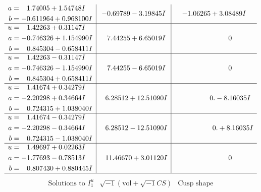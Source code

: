 \documentclass[1p]{elsarticle_modified}
\theoremstyle{definition}
\newcommand{\I}{\sqrt{-1}}
\begin{document}
$$\begin{array}{c|c|c}
\begin{aligned}
a &= \phantom{-}1.74005 + 1.54748 I \\
b &= -0.611964 + 0.968100 I\end{aligned}
 & -0.69789 - 3.19845 I & -1.06265 + 3.08489 I \\ \hline\begin{aligned}
u &= \phantom{-}1.42263 + 0.31147 I \\
a &= -0.746326 + 1.154990 I \\
b &= \phantom{-}0.845304 - 0.658411 I\end{aligned}
 & \phantom{-}7.44255 + 6.65019 I & \phantom{-0.000000 } 0 \\ \hline\begin{aligned}
u &= \phantom{-}1.42263 - 0.31147 I \\
a &= -0.746326 - 1.154990 I \\
b &= \phantom{-}0.845304 + 0.658411 I\end{aligned}
 & \phantom{-}7.44255 - 6.65019 I & \phantom{-0.000000 } 0 \\ \hline\begin{aligned}
u &= \phantom{-}1.41674 + 0.34279 I \\
a &= -2.20298 + 0.34664 I \\
b &= \phantom{-}0.724315 + 1.038040 I\end{aligned}
 & \phantom{-}6.28512 + 12.51090 I & \phantom{-0.000000 } 0. - 8.16035 I \\ \hline\begin{aligned}
u &= \phantom{-}1.41674 - 0.34279 I \\
a &= -2.20298 - 0.34664 I \\
b &= \phantom{-}0.724315 - 1.038040 I\end{aligned}
 & \phantom{-}6.28512 - 12.51090 I & \phantom{-0.000000 -}0. + 8.16035 I \\ \hline\begin{aligned}
u &= \phantom{-}1.49697 + 0.02263 I \\
a &= -1.77693 - 0.78513 I \\
b &= \phantom{-}0.807430 + 0.880445 I\end{aligned}
 & \phantom{-}11.46670 + 3.01120 I & \phantom{-0.000000 } 0\\
 \hline 
 \end{array}$$\newpage$$\begin{array}{c|c|c}  
\text{Solutions to }I^u_{1}& \I (\text{vol} + \sqrt{-1}CS) & \text{Cusp shape}\\
 \hline 
\begin{aligned}

\end{aligned}
\end{array}$$
\end{document}

